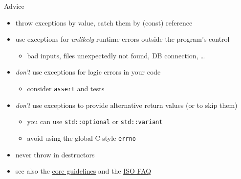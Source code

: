 \begin{frame}[fragile]
  \begin{exampleblock}{Advice}
    \begin{itemize}
      \item throw exceptions by value, catch them by (const) reference
      \item use exceptions for \textit{unlikely} runtime errors outside the program's control
      \begin{itemize}
        \item bad inputs, files unexpectedly not found, DB connection, \ldots
      \end{itemize}
      \item \textit{don't} use exceptions for logic errors in your code
      \begin{itemize}
        \item consider \texttt{assert} and tests
      \end{itemize}
      \item \textit{don't} use exceptions to provide alternative return values (or to skip them)
      \begin{itemize}
        \item you can use \texttt{std::optional} or \texttt{std::variant}
        \item avoid using the global C-style \texttt{errno}
      \end{itemize}
      \item never throw in destructors
      \item see also the \href{https://isocpp.github.io/CppCoreGuidelines/CppCoreGuidelines#S-errors}{\cpp core guidelines} and the \href{https://isocpp.org/wiki/faq/exceptions}{ISO \cpp FAQ}
    \end{itemize}
  \end{exampleblock}
\end{frame}

